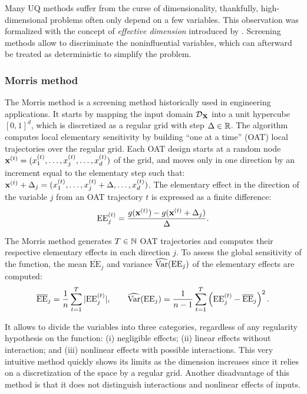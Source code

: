 Many UQ methods suffer from the curse of dimensionality, thankfully, high-dimensional problems often only depend on a few variables. 
This observation was formalized with the concept of \textit{effective dimension} introduced by \citet{owen_2003}. 
Screening methods allow to discriminate the noninfluential variables, which can afterward be treated as deterministic to simplify the problem.

\subsubsection{Morris method}

The Morris method \citep{morris_1991} is a screening method historically used in engineering applications. 
It starts by mapping the input domain $\mathcal{D}_{{\bf X}}$ into a unit hypercube $[0, 1]^d$, which is discretized as a regular grid with step $\Delta \in \mathbb{R}$. 
The algorithm computes local elementary sensitivity by building ``one at a time'' (OAT) local trajectories over the regular grid. 
Each OAT design starts at a random node ${\bf x}^{(t)} = (x^{(t)}_1, \dots, x^{(t)}_j,\dots, x^{(t)}_d)$ of the grid, and moves only in one direction by an increment equal to the elementary step such that: ${\bf x}^{(t)} + \Delta_j = (x^{(t)}_1, \dots, x^{(t)}_j + \Delta ,\dots, x^{(t)}_d)$. 
The elementary effect in the direction of the variable $j$ from an OAT trajectory $t$ is expressed as a finite difference: 
\begin{equation}
    \mathrm{EE}_j^{(t)} = \frac{g({\bf x}^{(t)}) - g({\bf x}^{(t)} + \Delta_j)}{\Delta}.
    \label{eq:eeffect}
\end{equation}

The Morris method generates $T\in\mathbb{N}$ OAT trajectories and computes their respective elementary effects in each direction $j$. 
To assess the global sensitivity of the function, the mean $\overline{\mathrm{EE}}_j$ and variance $\widehat{\operatorname{Var}}(\mathrm{EE}_j)$ of the elementary effects are computed: 
\begin{equation}
    \overline{\mathrm{EE}}_j = \frac1n \sum_{t=1}^{T} |\mathrm{EE}_j^{(t)}|, \qquad 
    \widehat{\operatorname{Var}}(\mathrm{EE}_j) = \frac{1}{n-1} \sum_{t=1}^{T} \left(\mathrm{EE}_j^{(t)} - \overline{\mathrm{EE}}_j\right)^2.
\end{equation}  


It allows to divide the variables into three categories, regardless of any regularity hypothesis on the function: 
(i) negligible effects; (ii) linear effects without interaction; and (iii) nonlinear effects with possible interactions. 
This very intuitive method quickly shows its limits as the dimension increases since it relies on a discretization of the space by a regular grid. 
Another disadvantage of this method is that it does not distinguish interactions and nonlinear effects of inputs.


